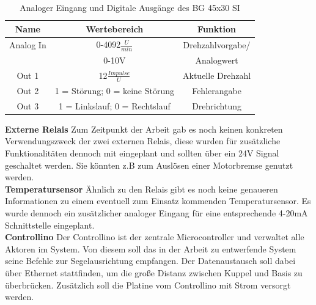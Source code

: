 \begin{table}[H]
	\centering
	\begin{tabular}{|c|c|c|}
		\hline
		\textbf{Name} & \textbf{Wertebereich} & \textbf{Funktion}      \\ \hline
		Analog In                & 0-4092$\frac{U}{min}$                        & Drehzahlvorgabe/            \\ & 0-10V & Analogwert \\ \hline		Out 1                & 12$\frac{Impulse}{U}$                        & Aktuelle Drehzahl             \\ \hline
		Out 2                & 1 = Störung; 0 = keine Störung                        &  Fehlerangabe            \\ \hline
		Out 3              & 1 = Linkslauf; 0 = Rechtslauf                       &  Drehrichtung           \\ \hline
	\end{tabular}%
	\caption{Analoger Eingang und Digitale Ausgänge des BG 45x30 SI}
	\label{tab:andere_Ausgaenge}
\end{table}

\noindent\textbf{Externe Relais}\newline
Zum Zeitpunkt der Arbeit gab es noch keinen konkreten Verwendungszweck der zwei externen Relais, diese wurden für zusätzliche Funktionalitäten dennoch mit eingeplant und sollten über ein 24V Signal geschaltet werden. Sie könnten z.B zum Auslösen einer Motorbremse genutzt werden.\\

\noindent\textbf{Temperatursensor}\newline
Ähnlich zu den Relais gibt es noch keine genaueren Informationen zu einem eventuell zum Einsatz kommenden Temperatursensor. Es wurde dennoch ein zusätzlicher analoger Eingang für eine entsprechende 4-20mA Schnittstelle eingeplant.\\

\noindent\textbf{Controllino}\newline
Der Controllino ist der zentrale Microcontroller und verwaltet alle Aktoren im System. Von diesem soll das in der Arbeit zu entwerfende System seine Befehle zur Segelausrichtung empfangen. Der Datenaustausch soll dabei über Ethernet stattfinden, um die große Distanz zwischen Kuppel und Basis zu überbrücken. Zusätzlich soll die Platine vom Controllino mit Strom versorgt werden.

